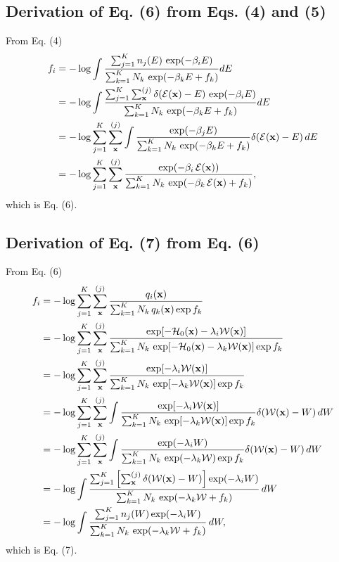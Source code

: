 \documentclass[aip,jcp,preprint,notitlepage, superscriptaddress]{revtex4-1}
\begin{document}
\subsection{Derivation of Eq. (6) from Eqs. (4) and (5)}



From Eq. (4)
\begin{align*}
f_i
&=
-\log
  \int
    \frac{
      \sum_{j = 1}^K n_j(E) \, \exp(-\beta_i E)
    }
    {
      \sum_{k = 1}^K N_k \, \exp(-\beta_k E + f_k)
    }
    dE
\\
&=
-\log
  \int
    \frac{
      \sum_{j = 1}^K \sum_{\mathbf{x}}^{(j)}
      \delta(\mathcal{E}(\mathbf{x}) - E) \, \exp(-\beta_i E)
    }
    {
      \sum_{k = 1}^K N_k \, \exp(-\beta_k E + f_k)
    }
    dE
\\
&=
-\log
  \sum_{j = 1}^K \sum_{\mathbf{x}}^{(j)}
  \int
    \frac{
      \exp(-\beta_j E)
    }
    {
      \sum_{k = 1}^K N_k \, \exp(-\beta_k E + f_k)
    }
    \delta(\mathcal{E}(\mathbf{x}) - E) \, dE
\\
&=
-\log
  \sum_{j = 1}^K \sum_{\mathbf{x}}^{(j)}
    \frac{
      \exp(-\beta_i \, \mathcal{E}(\mathbf{x}))
    }
    {
      \sum_{k = 1}^K N_k \, \exp(-\beta_k \, \mathcal{E}(\mathbf{x}) + f_k)
    },
\end{align*}
which is Eq. (6).



\subsection{Derivation of Eq. (7) from Eq. (6)}



From Eq. (6)
\begin{align*}
f_i
&=
-\log
\sum_{j = 1}^K
\sum_{\mathbf{x}}^{(j)}
\frac{
  q_i(\mathbf{x})
}
{
  \sum_{k = 1}^K N_k \, q_k(\mathbf{x}) \exp f_k
}
\\
&=
-\log
\sum_{j = 1}^K
\sum_{\mathbf{x}}^{(j)}
\frac{
  \exp[-\mathcal{H}_0(\mathbf{x}) - \lambda_i \mathcal{W}(\mathbf{x})]
}
{
  \sum_{k = 1}^K N_k \,
  \exp[-\mathcal{H}_0(\mathbf{x}) - \lambda_k \mathcal{W}(\mathbf{x})]
  \exp f_k
}
\\
&=
-\log
\sum_{j = 1}^K
\sum_{\mathbf{x}}^{(j)}
\frac{
  \exp[- \lambda_i \mathcal{W}(\mathbf{x})]
}
{
  \sum_{k = 1}^K N_k \,
  \exp[ - \lambda_k \mathcal{W}(\mathbf{x})]
  \exp f_k
}
\\
&=
-\log
\sum_{j = 1}^K
\sum_{\mathbf{x}}^{(j)}
\int
\frac{
  \exp[- \lambda_i \mathcal{W}(\mathbf{x})]
}
{
  \sum_{k = 1}^K N_k \,
  \exp[ - \lambda_k \mathcal{W}(\mathbf{x})]
  \exp f_k
}
\delta(\mathcal{W}(\mathbf{x}) - W) \, dW
\\
&=
-\log
\sum_{j = 1}^K
\sum_{\mathbf{x}}^{(j)}
\int
\frac{
  \exp(- \lambda_i W)
}
{
  \sum_{k = 1}^K N_k \,
  \exp( - \lambda_k \mathcal{W})
  \exp f_k
}
\delta(\mathcal{W}(\mathbf{x}) - W)
\, dW
\\
&=
-\log
\int
\frac{
  \sum_{j = 1}^K
  \left[
    \sum_{\mathbf{x}}^{(j)}
    \delta(\mathcal{W}(\mathbf{x}) - W)
  \right]
  \exp(- \lambda_i W)
}
{
  \sum_{k = 1}^K N_k \,
  \exp( - \lambda_k \mathcal{W} + f_k )
}
\, dW
\\
&=
-\log
\int
\frac{
  \sum_{j = 1}^K
  n_j(W)
  \exp(- \lambda_i W)
}
{
  \sum_{k = 1}^K N_k \,
  \exp( - \lambda_k \mathcal{W} + f_k )
}
\, dW,
\end{align*}
which is Eq. (7).
\end{document}
